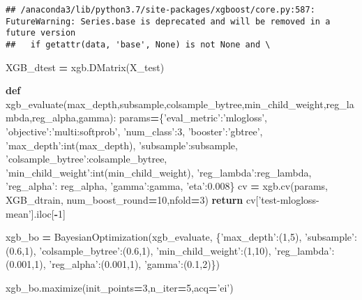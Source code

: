 \documentclass[]{article}
\newenvironment{Shaded}{\begin{snugshade}}{\end{snugshade}}
\newcommand{\BuiltInTok}[1]{#1}
\newcommand{\ControlFlowTok}[1]{\textcolor[rgb]{0.13,0.29,0.53}{\textbf{#1}}}
\newcommand{\DecValTok}[1]{\textcolor[rgb]{0.00,0.00,0.81}{#1}}
\newcommand{\FloatTok}[1]{\textcolor[rgb]{0.00,0.00,0.81}{#1}}
\newcommand{\KeywordTok}[1]{\textcolor[rgb]{0.13,0.29,0.53}{\textbf{#1}}}
\newcommand{\NormalTok}[1]{#1}
\newcommand{\OperatorTok}[1]{\textcolor[rgb]{0.81,0.36,0.00}{\textbf{#1}}}
\newcommand{\StringTok}[1]{\textcolor[rgb]{0.31,0.60,0.02}{#1}}
\begin{document}
\begin{verbatim}
## /anaconda3/lib/python3.7/site-packages/xgboost/core.py:587: FutureWarning: Series.base is deprecated and will be removed in a future version
##   if getattr(data, 'base', None) is not None and \
\end{verbatim}

\begin{Shaded}
\begin{Highlighting}[]
\NormalTok{XGB_dtest }\OperatorTok{=}\NormalTok{ xgb.DMatrix(X_test)}

\KeywordTok{def}\NormalTok{ xgb_evaluate(max_depth,subsample,colsample_bytree,min_child_weight,reg_lambda,reg_alpha,gamma):}
\NormalTok{    params}\OperatorTok{=}\NormalTok{\{}\StringTok{'eval_metric'}\NormalTok{:}\StringTok{'mlogloss'}\NormalTok{,}
            \StringTok{'objective'}\NormalTok{:}\StringTok{'multi:softprob'}\NormalTok{,}
            \StringTok{'num_class'}\NormalTok{:}\DecValTok{3}\NormalTok{,}
            \StringTok{'booster'}\NormalTok{:}\StringTok{'gbtree'}\NormalTok{,}
           \StringTok{'max_depth'}\NormalTok{:}\BuiltInTok{int}\NormalTok{(max_depth),}
            \StringTok{'subsample'}\NormalTok{:subsample,}
            \StringTok{'colsample_bytree'}\NormalTok{:colsample_bytree,}
            \StringTok{'min_child_weight'}\NormalTok{:}\BuiltInTok{int}\NormalTok{(min_child_weight),}
            \StringTok{'reg_lambda'}\NormalTok{:reg_lambda,}
            \StringTok{'reg_alpha'}\NormalTok{: reg_alpha,}
            \StringTok{'gamma'}\NormalTok{:gamma,}
           \StringTok{'eta'}\NormalTok{:}\FloatTok{0.008}\NormalTok{\}}
\NormalTok{    cv }\OperatorTok{=}\NormalTok{ xgb.cv(params, XGB_dtrain, num_boost_round}\OperatorTok{=}\DecValTok{10}\NormalTok{,nfold}\OperatorTok{=}\DecValTok{3}\NormalTok{)}
    \ControlFlowTok{return}\NormalTok{ cv[}\StringTok{'test-mlogloss-mean'}\NormalTok{].iloc[}\OperatorTok{-}\DecValTok{1}\NormalTok{]}

\NormalTok{xgb_bo }\OperatorTok{=}\NormalTok{ BayesianOptimization(xgb_evaluate,}
\NormalTok{                             \{}\StringTok{'max_depth'}\NormalTok{:(}\DecValTok{1}\NormalTok{,}\DecValTok{5}\NormalTok{),}
                             \StringTok{'subsample'}\NormalTok{:(}\FloatTok{0.6}\NormalTok{,}\DecValTok{1}\NormalTok{),}
                             \StringTok{'colsample_bytree'}\NormalTok{:(}\FloatTok{0.6}\NormalTok{,}\DecValTok{1}\NormalTok{),}
                             \StringTok{'min_child_weight'}\NormalTok{:(}\DecValTok{1}\NormalTok{,}\DecValTok{10}\NormalTok{),}
                             \StringTok{'reg_lambda'}\NormalTok{:(}\FloatTok{0.001}\NormalTok{,}\DecValTok{1}\NormalTok{),}
                             \StringTok{'reg_alpha'}\NormalTok{:(}\FloatTok{0.001}\NormalTok{,}\DecValTok{1}\NormalTok{),}
                             \StringTok{'gamma'}\NormalTok{:(}\FloatTok{0.1}\NormalTok{,}\DecValTok{2}\NormalTok{)\})}

\NormalTok{xgb_bo.maximize(init_points}\OperatorTok{=}\DecValTok{3}\NormalTok{,n_iter}\OperatorTok{=}\DecValTok{5}\NormalTok{,acq}\OperatorTok{=}\StringTok{'ei'}\NormalTok{)}
\end{Highlighting}
\end{Shaded}
\end{document}

